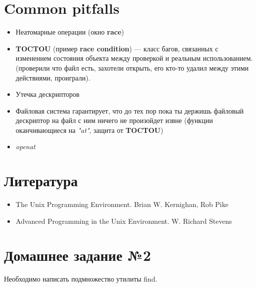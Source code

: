 \documentclass[../../lectures.tex]{subfiles}
\begin{document}
\section{Common pitfalls}
\begin{itemize}
    \item Неатомарные операции (окно \textbf{race})
    \item \textbf{TOCTOU} (пример \textbf{race condition}) --- класс багов, связанных
          с изменением состояния объекта между проверкой и реальным использованием.
          (проверили что файл есть, захотели открыть, его кто-то удалил между этими действиями,
          проиграли).
    \item Утечка дескрипторов
    \item Файловая система гарантирует, что до тех пор пока 
          ты держишь файловый дескриптор на файл с ним ничего 
          не произойдет извне (функции оканчивающиеся на \emph{"at"}, 
          защита от \textbf{TOCTOU})
    \item \emph{openat}
\end{itemize}

\section{Литература}
\begin{itemize}
    \item The Unix Programming Environment. Brian W. Kernighan, Rob Pike
    \item Advanced Programming in the Unix Environment. W. Richard Stevens
\end{itemize}

\section{Домашнее задание №2}
Необходимо написать подмножество утилиты find.
\end{document}
